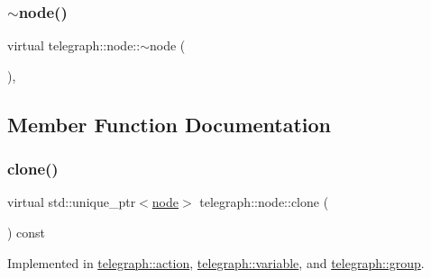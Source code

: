 \mbox{\label{classtelegraph_1_1node_a7fe858c56729feae1e92625ff4827209}} 
\subsubsection{\texorpdfstring{$\sim$node()}{~node()}}
{\footnotesize\ttfamily virtual telegraph\+::node\+::$\sim$node (\begin{DoxyParamCaption}{ }\end{DoxyParamCaption})\hspace{0.3cm}{\ttfamily [inline]}, {\ttfamily [virtual]}}



\subsection{Member Function Documentation}
\mbox{\label{classtelegraph_1_1node_ae90515f4573cfa43c168cba9d542df6b}} 
\subsubsection{\texorpdfstring{clone()}{clone()}}
{\footnotesize\ttfamily virtual std\+::unique\+\_\+ptr$<$\hyperlink{classtelegraph_1_1node}{node}$>$ telegraph\+::node\+::clone (\begin{DoxyParamCaption}{ }\end{DoxyParamCaption}) const\hspace{0.3cm}{\ttfamily [pure virtual]}}



Implemented in \hyperlink{classtelegraph_1_1action_aa72bffae4f241be8a4366e3c7344a17b}{telegraph\+::action}, \hyperlink{classtelegraph_1_1variable_a25d2ba4ae52c2bcad99a34b84ce7407b}{telegraph\+::variable}, and \hyperlink{classtelegraph_1_1group_a0e937eea18e4f650b892ac9061c461fa}{telegraph\+::group}.

\mbox{\label{classtelegraph_1_1node_a68c4aed1434da1f0ece9089ff99ffcdb}} 
